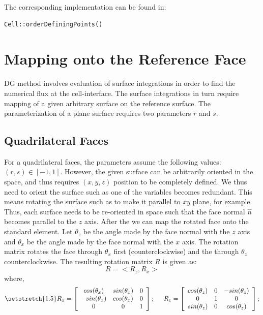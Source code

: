 The corresponding implementation can be found in: 
\begin{verbatim} 
Cell::orderDefiningPoints() 
\end{verbatim}

\section{Mapping onto the Reference Face}
DG method involves evaluation of surface integrations in order to find the numerical flux at the cell-interface.
The surface integrations in turn require mapping of a given arbitrary surface on the reference surface.
The parameterization of a plane surface requires two parameters $r$ and $s$. 

\subsection{Quadrilateral Faces}
For a quadrilateral faces, the parameters assume the following values: $(r,s) \in [-1,1]$.
However, the given surface can be arbitrarily oriented in the space, and thus requires $(x,y,z)$ position
to be completely defined. 
We thus need to orient the surface such as one of the variables becomes redundant. This means rotating 
the surface such as to make it parallel to $xy$ plane, for example. 
Thus, each surface needs to be re-oriented in space such that the face normal $\hat{n}$ becomes
parallel to the $z$ axis. After the we can map the rotated face onto the standard element. 
Let $\theta_z$ be the angle made by the face normal with the $z$ axis and $\theta_x$ be the angle made by
the face normal with the $x$ axis. 
The rotation matrix rotates the face through $\theta_x$ first (counterclockwise) and the through $\theta_z$
counterclockwise. The resulting rotation matrix $R$ is given as:
\begin{equation}\label{rotMat1}
	R = <R_z, R_x>
\end{equation}
where,
\begin{equation}\label{rotMat}
	{\setstretch{1.5}
	R_x = 
	 \left[\begin{array}{c c c}
				cos(\theta_x) & sin(\theta_x)  & 0  \\
			       -sin(\theta_x) & cos(\theta_x)  & 0  \\
				       0      &       0        & 1  \\
         \end{array} \right];
\hspace{5mm}
	R_z = 
	 \left[\begin{array}{c c c}
				cos(\theta_z)   & 0 & -sin(\theta_z) \\
				       0        & 1 &       0       \\
			        sin(\theta_z)   & 0 & cos(\theta_z) \\
         \end{array} \right];
 }
 \end{equation}
